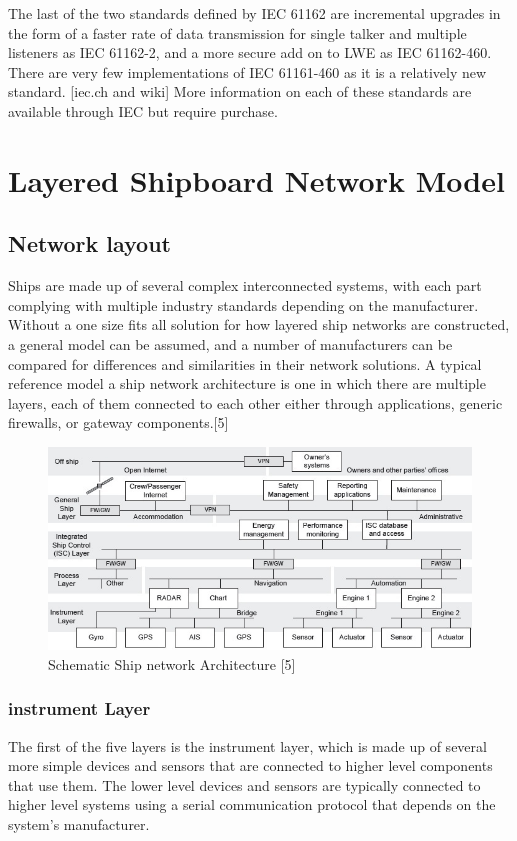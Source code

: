 \documentclass{report}
\begin{document}
The last of the two standards defined by IEC 61162 are incremental upgrades in the form of a faster rate of data transmission for single talker and multiple listeners as IEC 61162-2, and a more secure add on to LWE as IEC 61162-460. There are very few implementations of IEC 61161-460 as it is a relatively new standard. [iec.ch and wiki] More information on each of these standards are available through IEC but require purchase.



\chapter{Layered Shipboard Network Model}

\section{Network layout}
Ships are made up of several complex interconnected systems, with each part complying with multiple industry standards depending on the manufacturer. Without a one size fits all solution for how layered ship networks are constructed, a general model can be assumed, and a number of manufacturers can be compared for differences and similarities in their network solutions. A typical reference model a ship network architecture is one in which there are multiple layers, each of them connected to each other either through applications, generic firewalls, or gateway components.[5] 
\begin{figure}[h]
    \centering
    \includegraphics[width=12cm]{Images and Figures/isc-arch.jpg}
    \caption{Schematic Ship network Architecture [5]}
    \label{fig:network}
\end{figure}

\subsection{instrument Layer}
The first of the five layers is the instrument layer, which is made up of several more simple devices and sensors that are connected to higher level components 
that use them. The lower level devices and sensors are typically connected to higher level systems using a serial communication protocol that depends on the system's manufacturer. 
\end{document}
